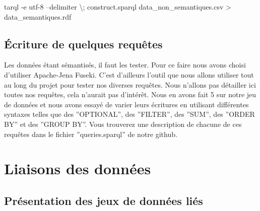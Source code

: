 \documentclass[a4paper,sffamily,12pt]{article}
\begin{document}
			\noindent tarql -e utf-8 --delimiter \textbackslash; construct.sparql data\_non\_semantiques.csv > data\_semantiques.rdf

			\vspace{0.5cm}

		\subsection{Écriture de quelques requêtes }
			
			\vspace{0.5cm}
	
			Les données étant sémantisés, il faut les tester. Pour ce faire nous avons choisi d'utiliser Apache-Jena Fuseki. C'est d'ailleurs l'outil que nous allons utiliser tout au long du projet pour tester nos diverses requêtes. Nous n'allons pas détailler ici toutes nos requêtes, cela n'aurait  pas d'intérêt. Nous en avons fait 5 sur notre jeu de données et nous avons essayé de varier leurs écritures en utilisant différentes syntaxes telles que des ''OPTIONAL'', des ''FILTER'', des ''SUM'', des ''ORDER BY'' et des ''GROUP BY''. Vous trouverez une description de chacune de ces requêtes dans le fichier ''queries.sparql'' de notre github.

			\vspace{0.5cm}
			
	\section{Liaisons des données}

		\vspace{0.5cm}
			
		\subsection{Présentation des jeux de données liés}
			
			\vspace{0.5cm}			
\end{document}
